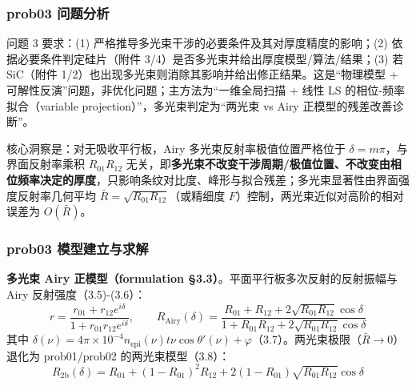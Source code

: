 \subsubsection{prob03 问题分析}\label{prob03-ux95eeux9898ux5206ux6790}

问题 3 要求：(1) 严格推导多光束干涉的必要条件及其对厚度精度的影响；(2)
依据必要条件判定硅片（附件 3/4）是否多光束并给出厚度模型/算法/结果；(3)
若 SiC（附件 1/2）也出现多光束则消除其影响并给出修正结果。这是``物理模型
+ 可解性反演''问题，非优化问题；主方法为``一维全局扫描 + 线性 LS
的相位-频率拟合（variable projection）''，多光束判定为``两光束 vs Airy
正模型的残差改善诊断''。

核心洞察是：对无吸收平行板，Airy 多光束反射率极值位置严格位于
\(\delta=m\pi\)，与界面反射率乘积 \(R_{01}R_{12}\)
无关，即\textbf{多光束不改变干涉周期/极值位置、不改变由相位频率决定的厚度}，只影响条纹对比度、峰形与拟合残差；多光束显著性由界面强度反射率几何平均
\(\bar R=\sqrt{R_{01}R_{12}}\)（或精细度
\(F\)）控制，两光束近似对高阶的相对误差为 \(O(\bar R)\)。

\subsubsection{prob03
模型建立与求解}\label{prob03-ux6a21ux578bux5efaux7acbux4e0eux6c42ux89e3}

\textbf{多光束 Airy 正模型（formulation
§3.3）}。平面平行板多次反射的反射振幅与 Airy 反射强度（3.5)-(3.6）：
\[r=\frac{r_{01}+r_{12}e^{i\delta}}{1+r_{01}r_{12}e^{i\delta}},\qquad R_{\mathrm{Airy}}(\delta)=\frac{R_{01}+R_{12}+2\sqrt{R_{01}R_{12}}\cos\delta}{1+R_{01}R_{12}+2\sqrt{R_{01}R_{12}}\cos\delta}\]
其中
\(\delta(\nu)=4\pi\times10^{-4}n_{\mathrm{epi}}(\nu)t\nu\cos\theta'(\nu)+\varphi\)（3.7）。两光束极限（\(\bar R\to0\)）退化为
prob01/prob02 的两光束模型（3.8）：
\[R_{2\mathrm b}(\delta)=R_{01}+(1-R_{01})^2R_{12}+2(1-R_{01})\sqrt{R_{01}R_{12}}\cos\delta\]

